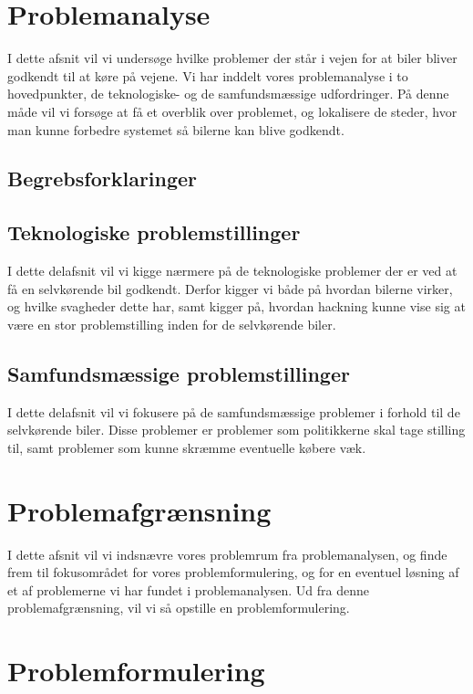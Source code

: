 \documentclass[12pt,hidelinks]{article}
\begin{document}
	\section{Problemanalyse}
	{I dette afsnit vil vi undersøge hvilke problemer der står i vejen for at biler bliver godkendt til at køre på vejene. Vi har inddelt vores problemanalyse i to hovedpunkter, de teknologiske- og de samfundsmæssige udfordringer. På denne måde vil vi forsøge at få et overblik over problemet, og lokalisere de steder, hvor man kunne forbedre systemet så bilerne kan blive godkendt.}
	\subsection{Begrebsforklaringer}
	
	\subsection{Teknologiske problemstillinger}
	I dette delafsnit vil vi kigge nærmere på de teknologiske problemer der er ved at få en selvkørende bil godkendt. Derfor kigger vi både på hvordan bilerne virker, og hvilke svagheder dette har, samt kigger på, hvordan hackning kunne vise sig at være en stor problemstilling inden for de selvkørende biler.
	
	
	
	\subsection{Samfundsmæssige problemstillinger}
	I dette delafsnit vil vi fokusere på de samfundsmæssige problemer i forhold til de selvkørende biler. Disse problemer er problemer som politikkerne skal tage stilling til, samt problemer som kunne skræmme eventuelle købere væk.
	
	
    
	\section{Problemafgrænsning}
	{I dette afsnit vil vi indsnævre vores problemrum fra problemanalysen, og finde frem til fokusområdet for vores problemformulering, og for en eventuel løsning af et af problemerne vi har fundet i problemanalysen. Ud fra denne problemafgrænsning, vil vi så opstille en problemformulering.}
    
	
    \section{Problemformulering}
    
	
	
\end{document}
